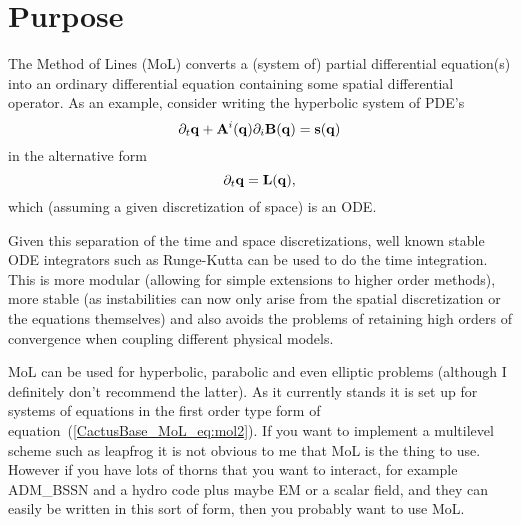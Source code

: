 

\section{Purpose}
\label{CactusBase_MoL_sec:purpose}

The Method of Lines (MoL) converts a (system of) partial differential
equation(s) into an ordinary differential equation containing some
spatial differential operator. As an example, consider writing the
hyperbolic system of PDE's
\begin{equation}
  \label{CactusBase_MoL_eq:mol1}
  \partial_t {\bf q} + {\bf A}^i({\bf q}) \partial_i {\bf B}({\bf q})
  = {\bf s}({\bf q})
\end{equation}
in the alternative form
\begin{equation}
  \label{CactusBase_MoL_eq:mol2}
  \partial_t {\bf q} = {\bf L}({\bf q}),
\end{equation}
which (assuming a given discretization of space) is an ODE.

Given this separation of the time and space discretizations, well
known stable ODE integrators such as Runge-Kutta can be used to do the
time integration. This is more modular (allowing for simple extensions
to higher order methods), more stable (as instabilities can now only
arise from the spatial discretization or the equations themselves) and
also avoids the problems of retaining high orders of convergence when
coupling different physical models.

MoL can be used for hyperbolic, parabolic and even elliptic problems
(although I definitely don't recommend the latter). As it currently
stands it is set up for systems of equations in the first order type
form of equation~(\ref{CactusBase_MoL_eq:mol2}). If you want to implement a
multilevel scheme such as leapfrog it is not obvious to me that MoL is
the thing to use. However if you have lots of thorns that you want to
interact, for example ADM\_BSSN and a hydro code plus maybe EM or a
scalar field, and they can easily be written in this sort of form,
then you probably want to use MoL.

